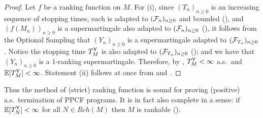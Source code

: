 \begin{proof}
Let $f$ be a ranking function on $M$.
For (i), since $(T_n)_{n \geq 0}$ is an increasing sequence of stopping times, each is adapted to $(\mathcal{F}_n)_{n \geq 0}$ and bounded (),
and $(f(M_n))_{n \geq 0}$ is a supermartingale also adapted to $(\mathcal{F}_n)_{n \geq 0}$ (),
it follows from the Optional Sampling  that $(Y_n)_{n \geq 0}$ %
is a supermartingale adapted to $(\mathcal{F}_{T_n})_{n \geq 0}$.
Notice the stopping time $T_M^{\mathsf{Y}}$ is also adapted to $(\mathcal{F}_{T_n})_{n \geq 0}$ (); and we have that $(Y_n)_{n \geq 0}$ is a $1$-ranking supermartingale.
Therefore, by , $T^{\mathsf{Y}}_M < \infty$ a.s.~and $\mathbb{E}[T^{\mathsf{Y}}_M] < \infty$.
Statement (ii) follows at once from  and .
\end{proof}

Thus the method of (strict) ranking function is sound for proving (positive) a.s.~termination of PPCF programs.
It is in fact also complete in a sense: if $\mathbb{E}[T^{\mathsf{Y}}_N] < \infty$ for all $N \in \mathit{Rch}(M)$ then $M$ is rankable ().
